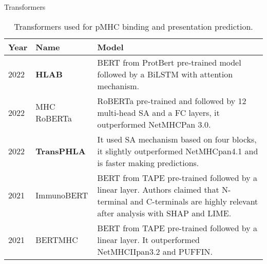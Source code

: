 \documentclass[10pt]{beamer}
\newcommand{\1}{
	\setbeamertemplate{background}{
		\texttt{[image: ../img/1]}
		\tikz[overlay] \fill[fill opacity=0.75,fill=white] (0,0) rectangle (-\paperwidth,\paperheight);
	}
}
\begin{document}
	
	\begin{frame}{Transformers}{}
		
		
		\begin{table}[]
			\caption{Transformers used for pMHC binding and presentation prediction.}
			\label{tab:transformes}
			\setlength{\tabcolsep}{0.5em} %
			{\renewcommand{\arraystretch}{1.1}%
				
				\begin{footnotesize}
					\begin{tabular}{p{0.8cm}p{1.5cm}p{7.3cm}}
						\multicolumn{1}{l}{\textbf{Year}}                                   & \textbf{Name}                       & \textbf{Model}     \\  \hline
						
						2022\cite{zhang2022hlab}&	\textbf{HLAB}&	BERT from ProtBert pre-trained model followed by a BiLSTM with attention mechanism.	\\
						
						2022\cite{wang2022mhcroberta}          & MHC RoBERTa             &  RoBERTa  pre-trained and followed by 12 multi-head SA and a FC layers, it outperformed NetMHCPan 3.0.                                                                                          \\
						2022\cite{chu2022transformer}          & \textbf{TransPHLA}                     & It used SA mechanism based on four blocks, it slightly outperformed NetMHCpan4.1 and is faster making predictions.\\
						
						2021\cite{gasser2021interpreting}  & ImmunoBERT                              & BERT from TAPE pre-trained followed by a linear layer. Authors claimed that N-terminal and C-terminals are highly relevant after analysis with SHAP and LIME.   \\
						
						2021\cite{cheng2021bertmhc}             & BERTMHC                            & BERT from TAPE pre-trained followed by a linear layer. It outperformed NetMHCIIpan3.2 and PUFFIN.   \\
						
					\end{tabular}
				\end{footnotesize}
			}
		\end{table}
		
		
	\end{frame}
	
\end{document}
